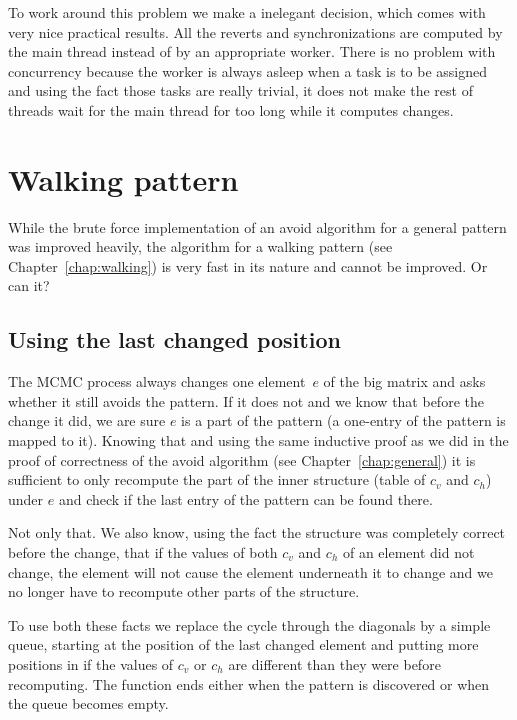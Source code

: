 To work around this problem we make a inelegant decision, which comes with very nice practical results. All the reverts and synchronizations are computed by the main thread instead of by an appropriate worker. There is no problem with concurrency because the worker is always asleep when a task is to be assigned and using the fact those tasks are really trivial, it does not make the rest of threads wait for the main thread for too long while it computes changes.
\pagebreak
\section{Walking pattern}
While the brute force implementation of an avoid algorithm for a general pattern was improved heavily, the algorithm for a walking pattern (see Chapter~\ref{chap:walking}) is very fast in its nature and cannot be improved. Or can it?

\subsection{Using the last changed position}
The MCMC process always changes one element~$e$ of the big matrix and asks whether it still avoids the pattern. If it does not and we know that before the change it did, we are sure $e$ is a part of the pattern (a one-entry of the pattern is mapped to it). Knowing that and using the same inductive proof as we did in the proof of correctness of the avoid algorithm (see Chapter~\ref{chap:general}) it is sufficient to only recompute the part of the inner structure (table of $c_v$ and $c_h$) under $e$ and check if the last entry of the pattern can be found there.

Not only that. We also know, using the fact the structure was completely correct before the change, that if the values of both $c_v$ and $c_h$ of an element did not change, the element will not cause the element underneath it to change and we no longer have to recompute other parts of the structure.

To use both these facts we replace the cycle through the diagonals by a simple queue, starting at the position of the last changed element and putting more positions in if the values of $c_v$ or $c_h$ are different than they were before recomputing. The function ends either when the pattern is discovered or when the queue becomes empty.

